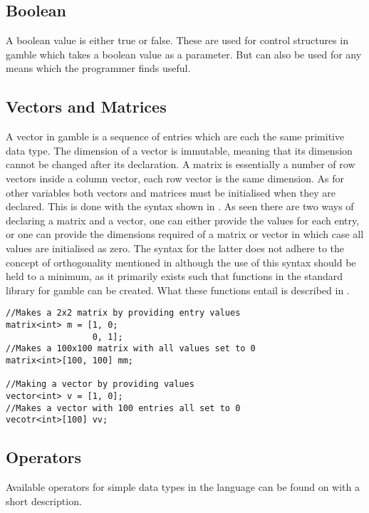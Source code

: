 \subsection*{Boolean}
A boolean value is either true or false. 
These are used for control structures in \gls{gamble} which takes a boolean value as a parameter. 
But can also be used for any means which the programmer finds useful. 

\subsection*{Vectors and Matrices}
A vector in \gls{gamble} is a sequence of entries which are each the same primitive data type. 
The dimension of a vector is immutable, meaning that its dimension cannot be changed after its declaration. 
A matrix is essentially a number of row vectors inside a column vector, each row vector is the same dimension. 
As for other variables both vectors and matrices must be initialised when they are declared. 
This is done with the syntax shown in .
As seen there are two ways of declaring a matrix and a vector, one can either provide the values for each entry, or one can provide the dimensions required of a matrix or vector in which case all values are initialised as zero.
The syntax for the latter does not adhere to the concept of orthogonality mentioned in  although the use of this syntax should be held to a minimum, as it primarily exists such that functions in the standard library for \gls{gamble} can be created.
What these functions entail is described in .

\begin{lstlisting}[caption={Syntax for creating a matrix or vector},label={lst:matrix},numbers=none]
//Makes a 2x2 matrix by providing entry values
matrix<int> m = [1, 0; 
                 0, 1];
//Makes a 100x100 matrix with all values set to 0
matrix<int>[100, 100] mm;

//Making a vector by providing values
vector<int> v = [1, 0];
//Makes a vector with 100 entries all set to 0
vecotr<int>[100] vv;
\end{lstlisting}

\subsection*{Operators}
Available operators for simple data types in the language can be found on  with a short description.  

